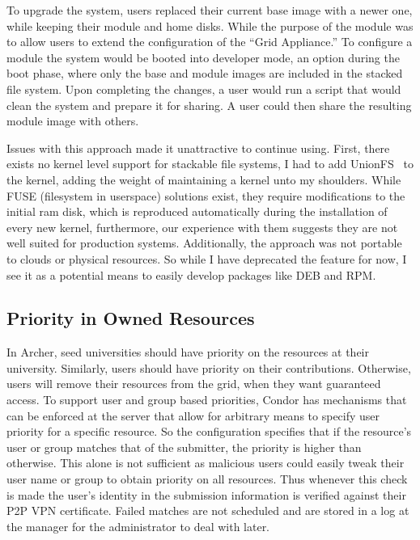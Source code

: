 To upgrade the system, users replaced their current base image with a newer
one, while keeping their module and home disks.  While the purpose of the
module was to allow users to extend the configuration of the ``Grid
Appliance.''  To configure a module the system would be booted into developer
mode, an option during the boot phase, where only the base and module images
are included in the stacked file system.  Upon completing the changes, a user
would run a script that would clean the system and prepare it for sharing.  A
user could then share the resulting module image with others.

Issues with this approach made it unattractive to continue using.  First, there
exists no kernel level support for stackable file systems, I had to add
UnionFS~\cite{unionfs} to the kernel, adding the weight of maintaining a kernel
unto my shoulders.  While FUSE (filesystem in userspace) solutions exist, they
require modifications to the initial ram disk, which is reproduced
automatically during the installation of every new kernel, furthermore, our
experience with them suggests they are not well suited for production systems.
Additionally, the approach was not portable to clouds or physical resources.
So while I have deprecated the feature for now, I see it as a potential means
to easily develop packages like DEB and RPM.

\subsection{Priority in Owned Resources}

In Archer, seed universities should have priority on the resources at their
university.  Similarly, users should have priority on their contributions.
Otherwise, users will remove their resources from the grid, when they want
guaranteed access.  To support user and group based priorities, Condor has
mechanisms that can be enforced at the server that allow for arbitrary means to
specify user priority for a specific resource.  So the configuration specifies
that if the resource's user or group matches that of the submitter, the
priority is higher than otherwise.  This alone is not sufficient as malicious
users could easily tweak their user name or group to obtain priority on all
resources.  Thus whenever this check is made the user's identity in the
submission information is verified against their P2P VPN certificate.  Failed
matches are not scheduled and are stored in a log at the manager for the
administrator to deal with later.

